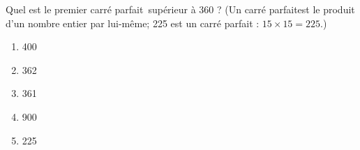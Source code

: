Quel est le premier \og carré parfait\fg\ supérieur à 360 ? (Un \og
carré parfait\fg est le produit d'un nombre entier par lui-même; 225
est un carré parfait : $15\times15=225$.)
\begin{multicols}{5}
  \begin{enumerate}[A/]
  \item 400
  \item 362
  \item 361
  \item 900
  \item 225
  \end{enumerate}
\end{multicols}